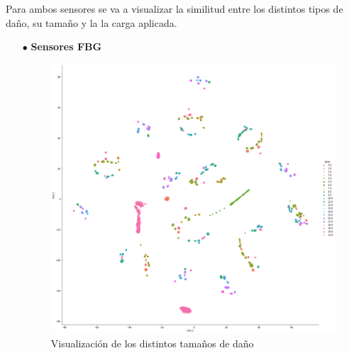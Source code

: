Para ambos sensores se va a visualizar la similitud entre los distintos tipos de daño, su tamaño y la la carga aplicada.

\begin{itemize}
    \item[$\bullet$] \textbf{Sensores FBG}

    \begin{figure}[H]
        \centering
        \includegraphics[width=150mm]{3/Fotos/Ty_Si_INESASSE_t-sne.png}
        \captionsetup{justification=centering,margin=1.25cm}
        \caption{Visualización de los distintos tamaños de daño}
        \label{fig:tsne_FBG_Ty_Si}
    \end{figure}  
    

\end{itemize}
